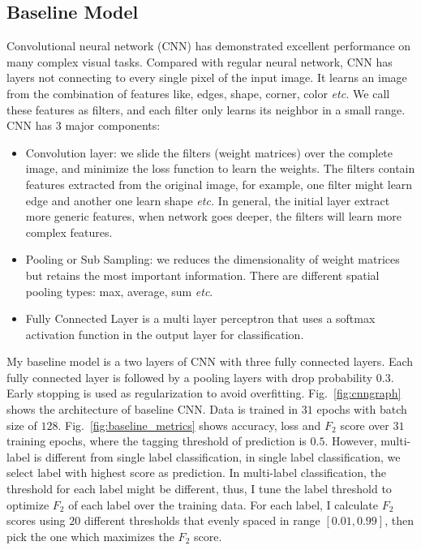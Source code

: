 \documentclass[11pt,oneside,a4paper]{article}
\begin{document}
\subsection{Baseline Model}
Convolutional neural network (CNN) has demonstrated excellent performance on many complex visual tasks. Compared with regular neural network, CNN has layers not connecting to every single pixel of the input image. It learns an image from the combination of features like, edges, shape, corner, color \emph{etc.} We call these features as filters, and each filter only learns its neighbor in a small range. CNN has 3 major components:
\begin{itemize}
\item  Convolution layer: we slide the filters (weight matrices) over the complete image, and minimize the loss function to learn the weights. The filters contain features extracted from the original image, for example, one filter might learn edge and another one learn shape \emph{etc.} In general, the initial layer extract more generic features, when network goes deeper, the filters will learn more complex features. 
\item Pooling or Sub Sampling: we reduces the dimensionality of weight matrices but retains the most important information. There are different spatial pooling types: max, average, sum \emph{etc}.
\item Fully Connected Layer is a multi layer perceptron that uses a softmax activation function in the output layer for classification.
\end{itemize}

My baseline model is a two layers of CNN with three fully connected  layers. Each fully connected layer is followed by a pooling layers with drop probability $0.3$. Early stopping is used as regularization to avoid overfitting. Fig.~\ref{fig:cnngraph} shows the architecture of baseline CNN. Data is trained in $31$ epochs with batch size of $128$. Fig.~\ref{fig:baseline_metrics} shows accuracy, loss and $F_2$ score over $31$ training epochs, where the tagging threshold of prediction is $0.5$. However, multi-label is different from single label classification, in single label classification, we select label with highest score as prediction. In multi-label classification, the threshold for each label might be different, thus, I tune the label threshold to optimize $F_2$ of each label over the training data. For each label, I calculate $F_2$ scores using $20$ different thresholds that evenly spaced in range $[0.01, 0.99]$, then pick the one which maximizes the $F_2$ score.
\end{document}
